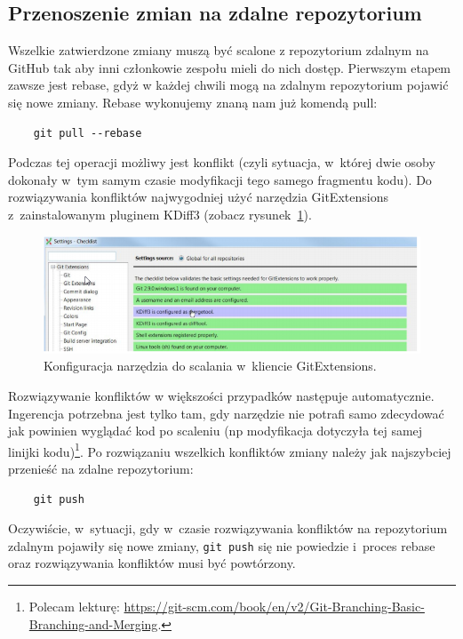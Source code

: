 \documentclass[12pt]{article}
\begin{document}
        \subsection*{Przenoszenie zmian na zdalne repozytorium}
        Wszelkie zatwierdzone zmiany muszą być scalone z repozytorium zdalnym na GitHub tak aby inni członkowie zespołu mieli do nich dostęp. Pierwszym etapem zawsze jest rebase, gdyż w każdej chwili mogą na zdalnym repozytorium pojawić się nowe zmiany. Rebase wykonujemy znaną nam już komendą pull:
        \begin{verbatim}
    git pull --rebase
        \end{verbatim}
        Podczas tej operacji możliwy jest konflikt (czyli sytuacja, w~której dwie osoby dokonały w~tym samym czasie modyfikacji tego samego fragmentu kodu). Do rozwiązywania konfliktów najwygodniej użyć narzędzia GitExtensions z~zainstalowanym pluginem KDiff3 (zobacz rysunek~\ref{fig:gitext-kdiff3}).
        \begin{figure}
            \centering
            \includegraphics{gitextensions-kdiff3}
            \caption{Konfiguracja narzędzia do scalania w~kliencie GitExtensions.}
            \label{fig:gitext-kdiff3}
        \end{figure}
        Rozwiązywanie konfliktów w większości przypadków następuje automatycznie. Ingerencja potrzebna jest tylko tam, gdy narzędzie nie potrafi samo zdecydować jak powinien wyglądać kod po scaleniu (np modyfikacja dotyczyła tej samej linijki kodu)\footnote{Polecam lekturę: \url{https://git-scm.com/book/en/v2/Git-Branching-Basic-Branching-and-Merging}.}. Po rozwiązaniu wszelkich konfliktów zmiany należy jak najszybciej przenieść na zdalne repozytorium:
        \begin{verbatim}
    git push
        \end{verbatim}
        Oczywiście, w~sytuacji, gdy w~czasie rozwiązywania konfliktów na repozytorium zdalnym pojawiły się nowe zmiany, \texttt{git push} się nie powiedzie i~proces rebase oraz rozwiązywania konfliktów musi być powtórzony.
\end{document}

